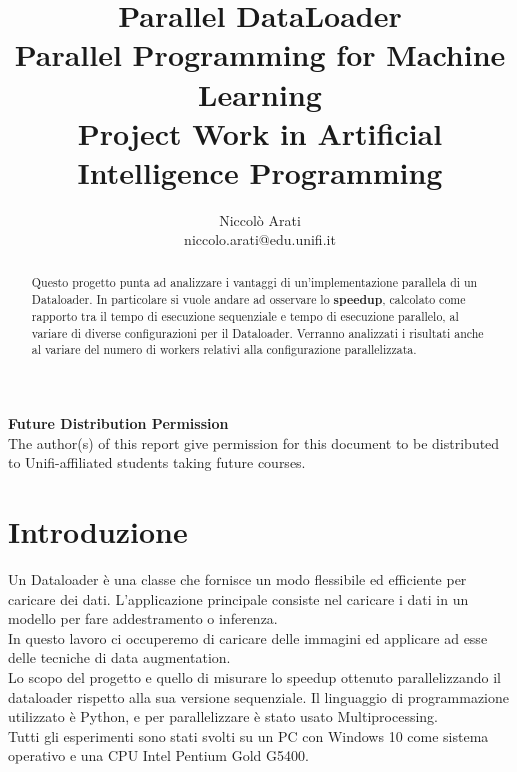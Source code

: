 \documentclass[10pt,twocolumn,letterpaper]{article}
\begin{document}
\title{Parallel DataLoader\\
\large Parallel Programming for Machine Learning\\Project Work in Artificial Intelligence Programming}

\author{Niccolò Arati\\
niccolo.arati@edu.unifi.it\\
}

\maketitle
\thispagestyle{empty}

\begin{abstract}
Questo progetto punta ad analizzare i vantaggi di un’implementazione parallela di un Dataloader. In particolare si vuole andare ad osservare lo \textbf{speedup}, calcolato come rapporto tra il tempo di esecuzione sequenziale e tempo di esecuzione parallelo, al variare di diverse configurazioni per il Dataloader. Verranno analizzati i risultati anche al variare del numero di workers relativi alla configurazione parallelizzata.

\end{abstract}

\noindent\large\textbf{Future Distribution Permission}\\
\indent The author(s) of this report give permission for this document to be distributed to Unifi-affiliated students taking future courses.


\section{Introduzione}
\label{sec:int}
Un Dataloader è una classe che fornisce un modo flessibile ed efficiente per caricare dei dati. L'applicazione principale consiste nel caricare i dati in un modello per fare addestramento o inferenza.\\
In questo lavoro ci occuperemo di caricare delle immagini ed applicare ad esse delle tecniche di data augmentation.\\
Lo scopo del progetto e quello di misurare lo speedup ottenuto parallelizzando il dataloader rispetto alla sua versione sequenziale. Il linguaggio di programmazione utilizzato è Python, e per parallelizzare è stato usato Multiprocessing.\\
Tutti gli esperimenti sono stati svolti su un PC con Windows 10 come sistema operativo e una CPU Intel Pentium Gold G5400.
\end{document}
